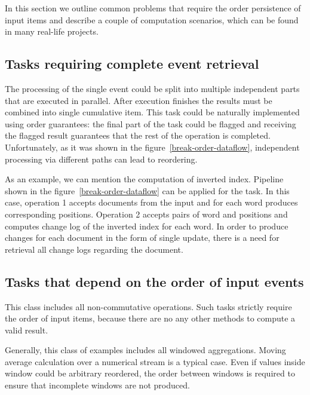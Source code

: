 
\label {fs-tasks}

In this section we outline common problems that require the order persistence of input items and describe a couple of computation scenarios, which can be found in many real-life projects.

\subsection{Tasks requiring complete event retrieval}
The processing of the single event could be split into multiple independent parts that are executed in parallel. After execution finishes the results must be combined into single cumulative item. This task could be naturally implemented using order guarantees: the final part of the task could be flagged and receiving the flagged result guarantees that the rest of the operation is completed. Unfortunately, as it was shown in the figure~\ref{break-order-dataflow}, independent processing via different paths can lead to reordering.

As an example, we can mention the computation of inverted index. Pipeline shown in the figure~\ref{break-order-dataflow} can be applied for the task. In this case, operation 1 accepts documents from the input and for each word produces corresponding positions. Operation 2 accepts pairs of word and positions and computes change log of the inverted index for each word. In order to produce changes for each document in the form of single update, there is a need for retrieval all change logs regarding the document.

\subsection{Tasks that depend on the order of input events}
This class includes all non-commutative operations. Such tasks strictly require the order of input items, because there are no any other methods to compute a valid result.

Generally, this class of examples includes all windowed aggregations. Moving average calculation over a numerical stream is a typical case. Even if values inside window could be arbitrary reordered, the order between windows is required to ensure that incomplete windows are not produced.